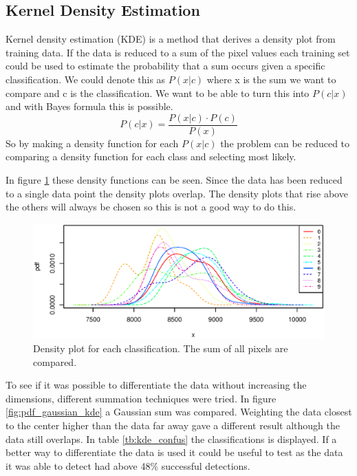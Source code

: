 \subsection{Kernel Density Estimation}

Kernel density estimation (KDE) is a method that derives a density plot from training data.
If the data is reduced to a sum of the pixel values each training set could be used to estimate the probability that a sum occurs given a specific classification. 
We could denote this as \(P(x|c)\) where x is the sum we want to compare and c is the classification.
We want to be able to turn this into \(P(c|x)\) and with Bayes formula this is possible. 
\[P(c|x) = \frac{P(x|c) \cdot P(c)}{P(x)}\]
So by making a density function for each \(P(x|c)\) the problem can be reduced to comparing a density function for each class and selecting most likely.

In figure \ref{fig:pdf_sum_kde} these density functions can be seen. 
Since the data has been reduced to a single data point the density plots overlap. 
The density plots that rise above the others will always be chosen so this is not a good way to do this.

\begin{figure}[H]
    \includegraphics[width = \textwidth]{graphics/kde_graphs_sum}
    \caption{Density plot for each classification. The sum of all pixels are compared.}
    \label{fig:pdf_sum_kde}
\end{figure}

To see if it was possible to differentiate the data without increasing the dimensions, different summation techniques were tried. 
In figure \ref{fig:pdf_gaussian_kde} a Gaussian sum was compared. Weighting the data closest to the center higher than the data far away gave a different result although the data still overlaps.
In table \ref{tb:kde_confus} the classifications is displayed. 
If a better way to differentiate the data is used it could be useful to test as the data it was able to detect had above 48\% successful detections.

